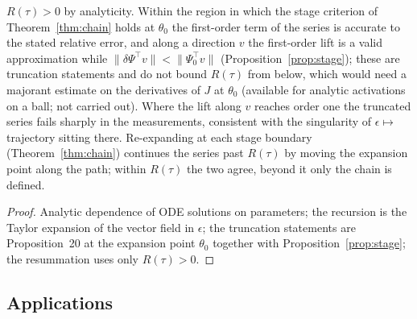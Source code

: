 \begin{theorem}
\label{thm:radius}
$R(\tau)>0$ by analyticity. Within the region in which the stage criterion of
Theorem~\ref{thm:chain} holds at $\theta_0$ the first-order term of the series
is accurate to the stated relative error, and along a direction $v$ the
first-order lift is a valid approximation while
$\|\delta\Psi^{\!\top}v\|<\|\Psi_0^{\!\top}v\|$ (Proposition~\ref{prop:stage}); these
are truncation statements and do not bound $R(\tau)$ from below, which would
need a majorant estimate on the derivatives of $J$ at $\theta_0$ (available
for analytic activations on a ball; not carried out). Where the lift along
$v$ reaches order one the truncated series fails sharply in the measurements,
consistent with the singularity of $\epsilon\mapsto$ trajectory sitting there.
Re-expanding at each
stage boundary (Theorem~\ref{thm:chain}) continues the series past $R(\tau)$
by moving the expansion point along the path; within $R(\tau)$ the two agree,
beyond it only the chain is defined.
\end{theorem}
\begin{proof}
Analytic dependence of ODE solutions on parameters; the recursion is the Taylor
expansion of the vector field in $\epsilon$; the truncation statements are
Proposition~20 at the expansion point $\theta_0$ together with
Proposition~\ref{prop:stage}; the resummation uses only $R(\tau)>0$.
\end{proof}


\subsection{Applications}
\label{ssec:chain-apps}

